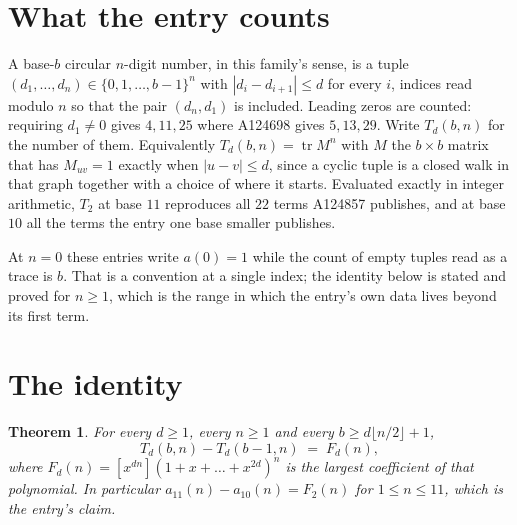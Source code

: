 \documentclass[11pt,a4paper]{article}
\theoremstyle{plain}
\newtheorem{theorem}{Theorem}
\theoremstyle{definition}
\begin{document}
\section{What the entry counts}

A base-$b$ circular $n$-digit number, in this family's sense, is a tuple
$(d_1,\dots,d_n)\in\{0,1,\dots,b-1\}^{n}$ with $|d_i-d_{i+1}|\le d$ for every $i$, indices
read modulo $n$ so that the pair $(d_n,d_1)$ is included. Leading zeros are counted: requiring
$d_1\ne0$ gives $4,11,25$ where A124698 gives $5,13,29$. Write $T_d(b,n)$ for the number of
them. Equivalently $T_d(b,n)=\operatorname{tr}M^{n}$ with $M$ the $b\times b$ matrix that has
$M_{uv}=1$ exactly when $|u-v|\le d$, since a cyclic tuple is a closed walk in that graph
together with a choice of where it starts. Evaluated exactly in integer arithmetic, $T_{2}$
at base $11$ reproduces all $22$ terms A124857 publishes, and at base $10$ all the
terms the entry one base smaller publishes.

At $n=0$ these entries write $a(0)=1$ while the count of empty tuples read as a trace is $b$.
That is a convention at a single index; the identity below is stated and proved for $n\ge1$,
which is the range in which the entry's own data lives beyond its first term.

\section{The identity}

\begin{theorem}
For every $d\ge1$, every $n\ge1$ and every $b\ge d\lfloor n/2\rfloor+1$,
\[
T_d(b,n)-T_d(b-1,n)\;=\;F_d(n),
\]
where $F_d(n)=[x^{dn}](1+x+\dots+x^{2d})^{n}$ is the largest coefficient of that
polynomial. In particular $a_{11}(n)-a_{10}(n)=F_{2}(n)$ for $1\le n\le11$, which
is the entry's claim.
\end{theorem}
\end{document}
